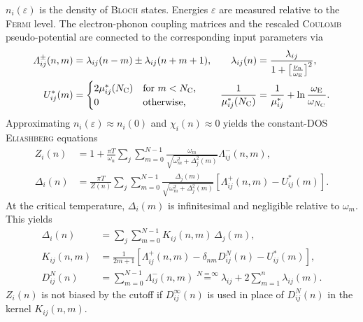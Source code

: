 \documentclass[a4paper]{article}
\def\sub#1{\sb{\mathrm{#1}}}
\let\Delta\varDelta
\let\epsilon\varepsilon
\let\Lambda\varLambda
\newlength\gap
\begin{document}
   $n_i(\epsilon)$ is the density of \textsc{Bloch} states. Energies $\epsilon$
   are measured relative to the \textsc{Fermi} level. The electron-phonon
   coupling matrices and the rescaled \textsc{Coulomb} pseudo-potential are
   connected to the corresponding input parameters via
   \begin{align*}
      \Lambda_{i j}^\pm(n, m) &=
      \lambda_{i j}(n - m) \pm \lambda_{i j}(n + m + 1),
      &
      \lambda_{i j}(n) &=
      \frac {\lambda_{i j}}{1 + \big[ \frac{\nu_n}{\omega \sub E} \big]^2},
      \\
      U^*_{i j}(m) &=
      \begin{cases}
         2 \mu^*_{i j}(N \sub C) & \text{for $m < N \sub C$,} \\
         0                       & \text{otherwise,}
      \end{cases}
      &
      \frac 1 {\mu^*_{i j}(N \sub C)} &=
      \frac 1 {\mu^*_{i j}} + \ln \frac{\omega \sub E}{\omega_{N \sub C}}.
   \end{align*}
   Approximating $n_i(\epsilon) \approx n_i(0)$ and $\chi_i(n) \approx 0$ yields
   the constant-DOS \textsc{Eliashberg} equations
   \begin{equation}
      \begin{split}
         Z_i(n) &= 1 + \frac{\pi T}{\omega_n} \sum_j \sum_{m = 0}^{N - 1}
         \frac{\omega_m}{\sqrt{\omega_m^2 + \Delta_j^2(m)}}
         \Lambda_{i j}^-(n, m),
         \\
         \Delta_i(n) &= \frac{\pi T}{Z(n)} \sum_j \sum_{m = 0}^{N - 1}
         \frac{\Delta_j(m)}{\sqrt{\omega_m^2 + \Delta_j^2(m)}}
         [\Lambda_{i j}^+(n, m) - U^*_{i j}(m)].
      \end{split}
      \label{cDOS Eliashberg equations}
   \end{equation}
   At the critical temperature, $\Delta_i(m)$ is infinitesimal and negligible
   relative to $\omega_m$. This yields
   \begin{equation}
      \begin{split}
         \Delta_i(n) &= \sum_j \sum_{m = 0}^{N - 1}
         K_{i j}(n, m) \, \Delta_j(m),
         \\
         K_{i j}(n, m) &= \frac 1 {2 m + 1}
         [\Lambda_{i j}^+(n, m) - \delta_{n m} D_{i j}^N(n) - U^*_{i j}(m)],
         \\
         D_{i j}^N(n) &=
         \sum_{m = 0}^{N - 1} \Lambda_{i j}^-(n, m) \overset{N = \infty} =
         \lambda_{i j} + 2 \sum_{m = 1}^n \lambda_{i j}(m).
      \end{split}
      \label{linearized gap equation}
   \end{equation}
   $Z_i(n)$ is not biased by the cutoff if $D_{i j}^\infty(n)$ is used in place
   of $D_{i j}^N(n)$ in the kernel $K_{i j}(n, m)$.
\end{document}
